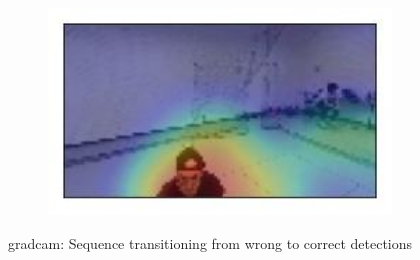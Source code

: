 \begin{figure}[!h]
\begin{center}
\begin{subfigure}[h]{0.24\textwidth}
		\end{subfigure}
		\hfill
		\begin{subfigure}[h]{0.24\textwidth}
			\centering
			\includegraphics[width=1\textwidth]{"contents/images/gradcam/gradcam-dario-4"}
		\end{subfigure}
	\end{center}
	\vspace{-0.5cm}
	\caption[\gls{gradcam}: Sequence transitioning from wrong to correct detections]{\gls{gradcam}: Sequence transitioning from wrong to correct detections}
	\label{fig:gradcam-seq-dario}
\end{figure}


